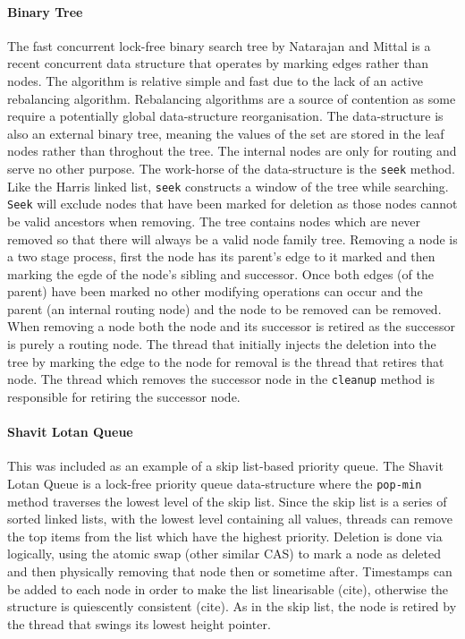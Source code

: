 \paragraph{Binary Tree} The fast concurrent lock-free binary search tree by Natarajan and Mittal is a recent concurrent data structure that operates by marking edges rather than nodes.\cite{LFBinaryTree} The algorithm is relative simple and fast due to the lack of an active rebalancing algorithm. Rebalancing algorithms are a source of contention as some require a potentially global data-structure reorganisation. The data-structure is also an external binary tree, meaning the values of the set are stored in the leaf nodes rather than throghout the tree. The internal nodes are only for routing and serve no other purpose. The work-horse of the data-structure is the \texttt{seek} method. Like the Harris linked list, \texttt{seek} constructs a window of the tree while searching. \texttt{Seek} will exclude nodes that have been marked for deletion as those nodes cannot be valid ancestors when removing. The tree contains nodes which are never removed so that there will always be a valid node family tree. Removing a node is a two stage process, first the node has its parent's edge to it marked and then marking the egde of the node's sibling and successor. Once both edges (of the parent) have been marked no other modifying operations can occur and the parent (an internal routing node) and the node to be removed can be removed. When removing a node both the node and its successor is retired as the successor is purely a routing node. The thread that initially injects the deletion into the tree by marking the edge to the node for removal is the thread that retires that node. The thread which removes the successor node in the \texttt{cleanup} method is responsible for retiring the successor node.

\paragraph{Shavit Lotan Queue} This was included as an example of a skip list-based priority queue.\cite{ShavitLotanQueue} The Shavit Lotan Queue is a lock-free priority queue data-structure where the \texttt{pop-min} method traverses the lowest level of the skip list. Since the skip list is a series of sorted linked lists, with the lowest level containing all values, threads can remove the top items from the list which have the highest priority. Deletion is done via logically, using the atomic swap (other similar CAS) to mark a node as deleted and then physically removing that node then or sometime after. Timestamps can be added to each node in order to make the list linearisable (cite), otherwise the structure is quiescently consistent (cite). As in the skip list, the node is retired by the thread that swings its lowest height pointer.

